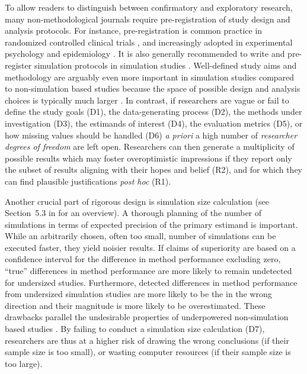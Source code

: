 \documentclass[a4paper, 11pt]{article}
\begin{document}
To allow readers to distinguish between confirmatory and exploratory research,
many non-methodological journals require pre-registration of study design and
analysis protocols. For instance, pre-registration is common practice in
randomized controlled clinical trials \citep{DeAngelis2004}, and increasingly
adopted in experimental psychology \citep{Nosek2018} and epidemiology
\citep{Lawlor2007, Loder2010}. It is also generally recommended to write and
pre-register simulation protocols in simulation studies \citep{Morris2019}. 
Well-defined study aims and methodology are arguably even more important in
simulation studies compared to non-simulation based studies because the space
of possible design and analysis choices is typically much larger \citep{Hoffmann2021}.
In contrast, if researchers are vague or fail to define the study goals
(D1), the data-generating process (D2), the methods under 
investigation (D3), the estimands of interest (D4), the evaluation metrics
(D5), or how missing values should be handled (D6) \emph{a priori} a high number of 
\emph{researcher degrees of freedom} \citep{Simmons2011} are left open.
Researchers can then generate a multiplicity of possible results which may 
foster overoptimistic impressions if they report only the subset of results
aligning with their hopes and belief (R2), and for which they can find plausible
justifications \emph{post hoc} (R1).

Another crucial part of rigorous design is simulation size calculation (see
Section~5.3 in \citet{Morris2019} for an overview). A thorough planning of the
number of simulations in terms of expected precision of the primary estimand is
important. While an arbitrarily chosen, often too small, number of simulations 
can be executed faster, they yield noisier results. If claims of superiority
are based on \eg{} a confidence interval for the difference in method performance
excluding zero, ``true'' differences in method performance are more likely to 
remain undetected for undersized studies. Furthermore, detected differences in
method performance from undersized simulation studies are more likely to be the
in the wrong direction and their magnitude is more likely to be overestimated.
These drawbacks parallel the undesirable properties of underpowered non-simulation
based studies \citep[increased type II, type S, and type M error, see \eg{}][]{Gelman2000, Gelman2014, Vanzwet2021}.
By failing to conduct a simulation size calculation (D7), researchers are thus at a
higher risk of drawing the wrong conclusions (if their sample size is too small),
or wasting computer resources (if their sample size is too large).
\end{document}

